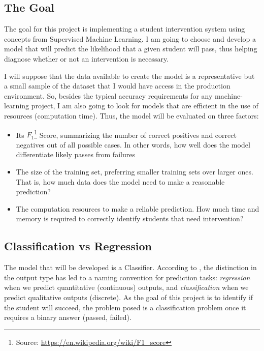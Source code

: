 \documentclass[a4paper]{article}
\begin{document}
\subsection{The Goal}
The goal for this project is implementing a student intervention system using concepts from Supervised Machine Learning. I am going to choose and develop a model that will predict the likelihood that a given student will pass, thus helping diagnose whether or not an intervention is necessary.

I will suppose that the data available to create the model is a representative but a small sample of the dataset that I would have access in the production environment. So, besides the typical accuracy requirements for any machine-learning project, I am also going to look for models that are efficient in the use of resources (computation time). Thus, the model will be evaluated on three factors:

\begin{itemize}
\item Its $F_1$\footnote{Source: \url{https://en.wikipedia.org/wiki/F1_score}} Score, summarizing the number of correct positives and correct negatives out of all possible cases. In other words, how well does the model differentiate likely passes from failures
\item The size of the training set, preferring smaller training sets over larger ones. That is, how much data does the model need to make a reasonable prediction?
\item The computation resources to make a reliable prediction. How much time and memory is required to correctly identify students that need intervention?
\end{itemize}

\subsection{Classification vs Regression}
The model that will be developed is a Classifier. According to \cite{Hastie_2009}, the distinction in the output type has led to a naming convention for prediction tasks: \textit{regression} when we predict quantitative (continuous) outputs, and \textit{classification} when we predict qualitative outputs (discrete). As the goal of this project is to identify if the student will succeed, the problem posed is a classification problem once it requires a binary answer (passed, failed).

\end{document}
